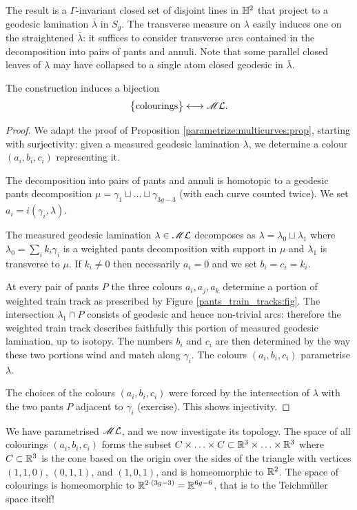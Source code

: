 The result is a $\Gamma$-invariant closed set of disjoint lines in $\mathbb{H}^2$ that project to a geodesic lamination $\bar\lambda$ in $S_g$. The transverse measure on $\lambda$ easily induces one on the straightened $\bar\lambda$: it suffices to consider transverse arcs contained in the decomposition into pairs of pants and annuli. Note that some parallel closed leaves of $\lambda$ may have collapsed to a single atom closed geodesic in $\bar\lambda$.


\begin{prop} \label{parametrize:laminations:prop}
The construction induces a bijection
$$\big\{ {\rm colourings}\big\} \longleftrightarrow \mathscr{M}\mathcal{L}.$$
\end{prop}
\begin{proof}
We adapt the proof of Proposition \ref{parametrize:multicurves:prop}, starting with surjectivity: given a measured geodesic lamination $\lambda$, we determine a colour $(a_i,b_i,c_i)$ representing it.

The decomposition into pairs of pants and annuli is homotopic to a geodesic pants decomposition $\mu=\gamma_1\sqcup \ldots \sqcup \gamma_{3g-3}$ (with each curve counted twice). We set $a_i = i(\gamma_i,\lambda)$.

The measured geodesic lamination $\lambda \in \mathscr{M}\mathcal{L}$ decomposes as $\lambda = \lambda_0 \sqcup \lambda_1$ where $\lambda_0 = \sum_ik_i\gamma_i$ is a weighted pants decomposition with support in $\mu$ and $\lambda_1$ is transverse to $\mu$. If $k_i\neq 0$ then necessarily $a_i=0$ and we set $b_i=c_i=k_i$.

At every pair of pants $P$ the three colours $a_i,a_j,a_k$ determine a portion of weighted train track as prescribed by Figure \ref{pants_train_tracks:fig}. The intersection $\lambda_1\cap P$ consists of geodesic and hence non-trivial arcs: therefore the weighted train track describes faithfully this portion of measured geodesic lamination, up to isotopy. The numbers $b_i$ and $c_i$ are then determined by the way these two portions wind and match along $\gamma_i$. The colours $(a_i,b_i,c_i)$ parametrise $\lambda$.

The choices of the colours $(a_i,b_i,c_i)$ were forced by the intersection of $\lambda$ with the two pants $P$ adjacent to $\gamma_i$ (exercise). This shows injectivity.
\end{proof}

We have parametrised $\mathscr{M}\mathcal{L}$, and we now investigate its topology. The space of all colourings $(a_i,b_i,c_i)$ forms the subset $C\times \ldots \times C \subset \mathbb{R}^3 \times \ldots \times \mathbb{R}^3$ where $C \subset \mathbb{R}^3$ is the cone based on the origin over the sides of the triangle with vertices $(1,1,0)$, $(0,1,1)$, and $(1,0,1)$, and is homeomorphic to $\mathbb{R}^2$. The space of colourings is homeomorphic to $\mathbb{R}^{2\cdot (3g-3)} = \mathbb{R}^{6g-6}$, that is to the Teichm\"uller space itself!

